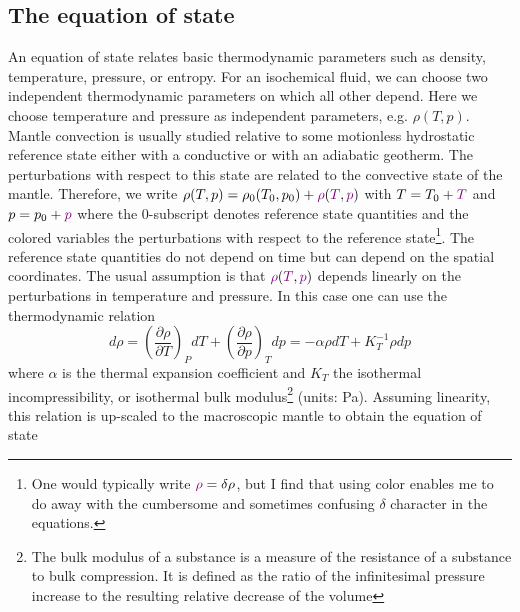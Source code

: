\newpage











\subsection{The equation of state}

An equation of state relates basic thermodynamic parameters such as density,
temperature, pressure, or entropy. For an isochemical fluid, we can choose two
independent thermodynamic parameters on which all other depend. Here we choose
temperature and pressure as independent parameters, e.g. $\rho(T,p)$. 
Mantle convection is
usually studied relative to some motionless hydrostatic reference state either with a
conductive or with an adiabatic geotherm. The perturbations with respect to this state are
related to the convective state of the mantle. 
Therefore, we write $\rho(T,p) = \rho_0(T_0,p_0) 
+ {\color{violet}\rho}({\color{violet}T},{\color{violet} p} )$
with 
$T = T_0 + {\color{violet}T}$ and 
$p = p_0 + {\color{violet}p}$ 
where the 0-subscript denotes reference
state quantities and the {\color{violet}colored} variables 
the perturbations with respect to the reference state\footnote{One would typically 
write ${\color{violet}\rho}=\delta \rho$, but I find that using color enables me
to do away with the cumbersome and sometimes confusing $\delta$ character in the equations.}. 
The reference state quantities do not depend on time but can depend on the spatial
coordinates. The usual assumption is that ${\color{violet}\rho}({\color{violet}T},{\color{violet} p})$ 
depends linearly on the perturbations in temperature and pressure. 
In this case one can use the thermodynamic relation
\[
d\rho = 
\left( \frac{\partial \rho}{\partial T} \right)_P dT + 
\left( \frac{\partial \rho}{\partial p} \right)_T dp 
= -\alpha \rho dT + K_T^{-1} \rho dp
\]
where $\alpha$ is the thermal expansion coefficient and 
$K_T$ the isothermal incompressibility, or isothermal bulk
modulus\footnote{The bulk modulus of a substance is a measure of the resistance of a substance to bulk 
compression. It is defined as the ratio of the infinitesimal pressure increase to the resulting relative 
decrease of the volume} (units: \si{\pascal}). Assuming linearity, this relation is up-scaled to the macroscopic mantle to
obtain the equation of state
